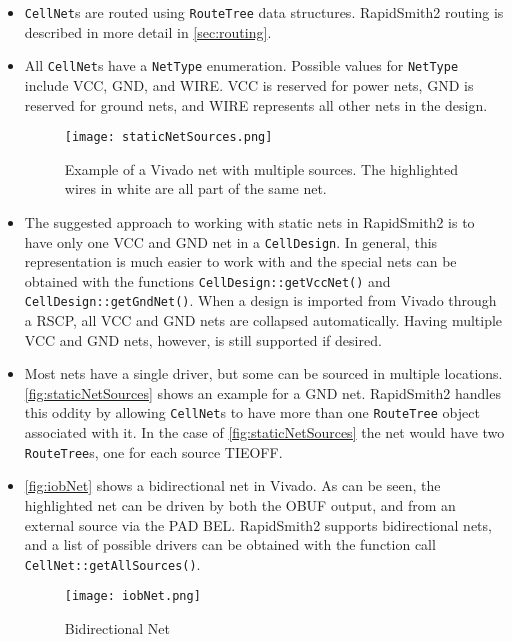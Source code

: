 \begin{itemize}
  \item \texttt{CellNet}s are routed using \texttt{RouteTree} data structures.
  RapidSmith2 routing is described in more detail in \autoref{sec:routing}.
  
  \item All \texttt{CellNet}s have a \texttt{NetType} enumeration. Possible values for
  \texttt{NetType} include VCC, GND, and WIRE. VCC is reserved for power nets, GND
  is reserved for ground nets, and WIRE represents all other nets in the design.
  
  \begin{figure}[t!]
   \centering
   \texttt{[image: staticNetSources.png]}
   \caption{Example of a Vivado net with multiple sources. The highlighted
   wires in white are all part of the same net.}
   \label{fig:staticNetSources}
  \end{figure}
  
  \item The suggested approach to working with static nets in RapidSmith2 is to
  have only one VCC and GND net in a \texttt{CellDesign}. In general, this
  representation is much easier to work with and the special nets
  can be obtained with the functions \texttt{CellDesign::getVccNet()}
  and \texttt{CellDesign::getGndNet()}. When a design is imported from Vivado
  through a RSCP, all VCC and GND nets are collapsed automatically. Having
  multiple VCC and GND nets, however, is still supported if desired.
  
  \item Most nets have a single driver, but some can be sourced in multiple
  locations. \autoref{fig:staticNetSources} shows an example for a GND
  net. RapidSmith2 handles this oddity by allowing \texttt{CellNet}s to have
  more than one \texttt{RouteTree} object associated with it. In the case of
  \autoref{fig:staticNetSources} the net would have two \texttt{RouteTree}s,
  one for each source TIEOFF.
  
  \item \autoref{fig:iobNet} shows a bidirectional net in Vivado. As can be
  seen, the highlighted net can be driven by both the OBUF output, and from an
  external source via the PAD BEL. RapidSmith2 supports bidirectional nets, 
  and a list of possible drivers can be obtained with the function call
  \texttt{CellNet::getAllSources()}.
  
  \begin{figure}[H]
   \centering
   \texttt{[image: iobNet.png]}
   \caption{Bidirectional Net}
   \label{fig:iobNet}
  \end{figure}


\end{itemize}
